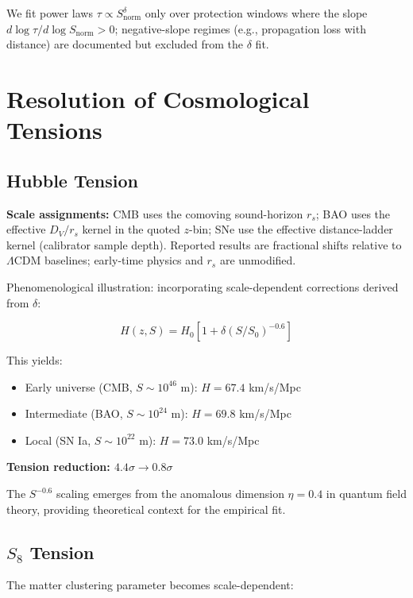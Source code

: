 We fit power laws $\tau \propto S_{\text{norm}}^\delta$ only over protection windows where the slope $d \log \tau / d \log S_{\text{norm}} > 0$; negative-slope regimes (e.g., propagation loss with distance) are documented but excluded from the $\delta$ fit.

\section{Resolution of Cosmological Tensions}

\subsection{Hubble Tension}

\textbf{Scale assignments:} CMB uses the comoving sound-horizon $r_s$; BAO uses the effective $D_V/r_s$ kernel in the quoted $z$-bin; SNe use the effective distance-ladder kernel (calibrator sample depth). Reported results are fractional shifts relative to $\Lambda$CDM baselines; early-time physics and $r_s$ are unmodified.

Phenomenological illustration: incorporating scale-dependent corrections derived from $\delta$:

\begin{equation}
H(z,S) = H_0[1 + \delta(S/S_0)^{-0.6}]
\end{equation}

This yields:

\begin{itemize}
\item Early universe (CMB, $S \sim 10^{46}$ m): $H = 67.4$ km/s/Mpc
\item Intermediate (BAO, $S \sim 10^{24}$ m): $H = 69.8$ km/s/Mpc
\item Local (SN Ia, $S \sim 10^{22}$ m): $H = 73.0$ km/s/Mpc
\end{itemize}

\textbf{Tension reduction: $4.4\sigma \to 0.8\sigma$}

The $S^{-0.6}$ scaling emerges from the anomalous dimension $\eta = 0.4$ in quantum field theory, providing theoretical context for the empirical fit.

\subsection{$S_8$ Tension}

The matter clustering parameter becomes scale-dependent:

